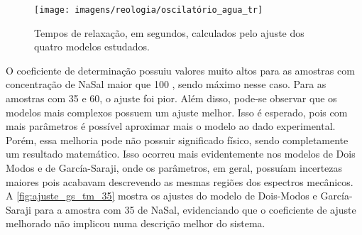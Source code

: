 	\begin{figure}[h]
		\centering
		\texttt{[image: imagens/reologia/oscilatório\_agua\_tr]}
		\caption{Tempos de relaxação, em segundos, calculados pelo ajuste dos quatro modelos estudados.}
		\label{fig:oscilatorio_agua_tr}  
	\end{figure}
	
	O coeficiente de determinação possuiu valores muito altos para as amostras com concentração de NaSal maior que 100 \mM, sendo máximo nesse caso. Para as amostras com 35 e 60, o ajuste foi pior. Além disso, pode-se observar que os modelos mais complexos possuem um ajuste melhor. Isso é esperado, pois com mais parâmetros é possível aproximar mais o modelo ao dado experimental. Porém, essa melhoria pode não possuir significado físico, sendo completamente um resultado matemático. Isso ocorreu mais evidentemente nos modelos de Dois Modos e de García-Saraji, onde os parâmetros, em geral, possuíam incertezas maiores pois acabavam descrevendo as mesmas regiões dos espectros mecânicos. A \autoref{fig:ajuste_gs_tm_35} mostra os ajustes do modelo de Dois-Modos e García-Saraji para a amostra com 35 \mM{} de NaSal, evidenciando que o coeficiente de ajuste melhorado não implicou numa descrição melhor do sistema.
	


